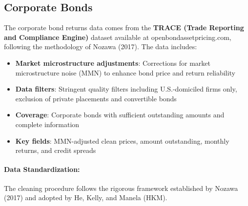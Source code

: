 \documentclass{article}
\begin{document}

\subsection{Corporate Bonds}
\label{sec:corporate_bonds}
The corporate bond returns data comes from the \textbf{TRACE (Trade Reporting and Compliance Engine)} dataset available at openbondassetpricing.com, following the methodology of Nozawa (2017). The data includes:

\begin{itemize}
    \item \textbf{Market microstructure adjustments}: Corrections for market microstructure noise (MMN) to enhance bond price and return reliability
    \item \textbf{Data filters}: Stringent quality filters including U.S.-domiciled firms only, exclusion of private placements and convertible bonds
    \item \textbf{Coverage}: Corporate bonds with sufficient outstanding amounts and complete information
    \item \textbf{Key fields}: MMN-adjusted clean prices, amount outstanding, monthly returns, and credit spreads
\end{itemize}

\paragraph{Data Standardization:}

The cleaning procedure follows the rigorous framework established by Nozawa (2017) and adopted by He, Kelly, and Manela (HKM).
\end{document}
